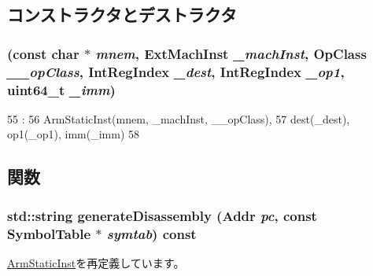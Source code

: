 \subsection{コンストラクタとデストラクタ}
\hypertarget{classArmISA_1_1DataXImmOp_a466686dc0008b6b72fc4367918e7d42a}{
\subsubsection[{DataXImmOp}]{ (const char $\ast$ {\em mnem}, \/  {\bf ExtMachInst} {\em \_\-machInst}, \/  OpClass {\em \_\-\_\-opClass}, \/  {\bf IntRegIndex} {\em \_\-dest}, \/  {\bf IntRegIndex} {\em \_\-op1}, \/  uint64\_\-t {\em \_\-imm})}}
\label{classArmISA_1_1DataXImmOp_a466686dc0008b6b72fc4367918e7d42a}



\begin{DoxyCode}
55                                                                    :
56         ArmStaticInst(mnem, _machInst, __opClass),
57         dest(_dest), op1(_op1), imm(_imm)
58     {}

\end{DoxyCode}


\subsection{関数}
\hypertarget{classArmISA_1_1DataXImmOp_a95d323a22a5f07e14d6b4c9385a91896}{
\subsubsection[{generateDisassembly}]{\setlength{\rightskip}{0pt plus 5cm}std::string generateDisassembly ({\bf Addr} {\em pc}, \/  const SymbolTable $\ast$ {\em symtab}) const}}
\label{classArmISA_1_1DataXImmOp_a95d323a22a5f07e14d6b4c9385a91896}


\hyperlink{classArmISA_1_1ArmStaticInst_a95d323a22a5f07e14d6b4c9385a91896}{ArmStaticInst}を再定義しています。


